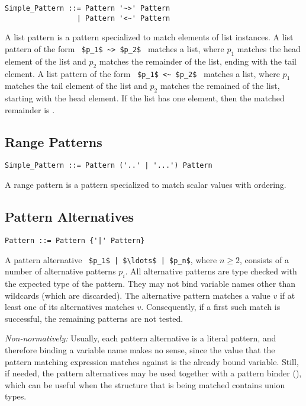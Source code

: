 \syntax\begin{lstlisting}
Simple_Pattern ::= Pattern '~>' Pattern
                 | Pattern '<~' Pattern
\end{lstlisting}

A list pattern is a pattern specialized to match elements of list instances. A list pattern of the form ~\lstinline!$p_1$ ~> $p_2$!~ matches a list, where $p_1$ matches the head element of the list and $p_2$ matches the remainder of the list, ending with the tail element. A list pattern of the form ~\lstinline!$p_1$ <~ $p_2$!~ matches a list, where $p_1$ matches the tail element of the list and $p_2$ matches the remained of the list, starting with the head element. If the list has one element, then the matched remainder is . 





\subsection{Range Patterns}
\label{sec:range-patterns}

\syntax\begin{lstlisting}
Simple_Pattern ::= Pattern ('..' | '...') Pattern
\end{lstlisting}

A range pattern is a pattern specialized to match scalar values with ordering.






\subsection{Pattern Alternatives}
\label{sec:pattern-alternatives}

\syntax\begin{lstlisting}
Pattern ::= Pattern {'|' Pattern}
\end{lstlisting}

A pattern alternative ~\lstinline!$p_1$ | $\ldots$ | $p_n$!, where $n \geq 2$, consists of a number of alternative patterns $p_i$. All alternative patterns are type checked with the expected type of the pattern. They may not bind variable names other than wildcards (which are discarded). The alternative pattern matches a value $v$ if at least one of its alternatives matches $v$. Consequently, if a first such match is successful, the remaining patterns are not tested.

{\em Non-normatively:} Usually, each pattern alternative is a literal pattern, and therefore binding a variable name makes no sense, since the value that the pattern matching expression matches against is the already bound variable. Still, if needed, the pattern alternatives may be used together with a pattern binder (), which can be useful when the structure that is being matched contains union types. 





